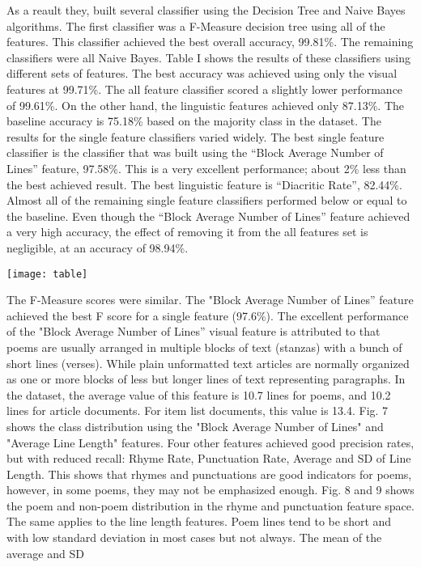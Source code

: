 \documentclass[12pt]{report}
\begin{document}
As a reault they, built several classifier using the Decision Tree and Naive Bayes algorithms.
The first classifier was a F-Measure decision tree using all of the features.
This classifier achieved the best overall accuracy, 99.81\%. The remaining
classifiers were all Naive Bayes. Table I shows the results of these classifiers
using different sets of features. The best accuracy was achieved using only the
visual features at 99.71\%. The all feature classifier scored a slightly lower
performance of 99.61\%. On the other hand, the linguistic features achieved only
87.13\%. The baseline accuracy is 75.18\% based on the majority class in the
dataset. The results for the single feature classifiers varied widely. The best
single feature classifier is the classifier that was built using the “Block
Average Number of Lines” feature, 97.58\%. This is a very excellent performance;
about 2\% less than the best achieved result. The best linguistic feature is
“Diacritic Rate”, 82.44\%. Almost all of the remaining single feature classifiers
performed below or equal to the baseline. Even though the “Block Average Number
of Lines” feature achieved a very high accuracy, the effect of removing it from
the all features set is negligible, at an accuracy of 98.94\%. 
\begin{center}
\texttt{[image: table]}
\end{center}
The F-Measure scores were similar. The "Block Average Number of Lines” feature achieved the best F score for
a single feature (97.6\%). The excellent performance of the "Block Average Number of Lines” visual feature is
attributed to that poems are usually arranged in multiple blocks of text (stanzas) with a bunch of short lines
(verses). While plain unformatted text articles are normally organized as one or more blocks of less but longer
lines of text representing paragraphs. In the dataset, the average value of this feature is 10.7 lines for poems, and
10.2 lines for article documents. For item list documents, this value is 13.4. Fig. 7 shows the class distribution
using the "Block Average Number of Lines" and "Average Line Length" features.
Four other features achieved good precision rates, but with reduced recall: Rhyme Rate, Punctuation Rate,
Average and SD of Line Length. This shows that rhymes and punctuations are good indicators for poems,
however, in some poems, they may not be emphasized enough. Fig. 8 and 9 shows the poem and non-poem
distribution in the rhyme and punctuation feature space. The same applies to the line length features. Poem lines
tend to be short and with low standard deviation in most cases but not always. The mean of the average and SD
\end{document}
